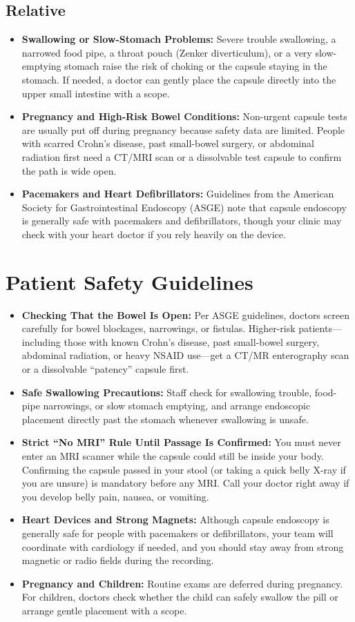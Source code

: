 \subsection{Relative}
\begin{itemize}
    \item \textbf{Swallowing or Slow-Stomach Problems:} Severe trouble swallowing, a narrowed food pipe, a throat pouch (Zenker diverticulum), or a very slow-emptying stomach raise the risk of choking or the capsule staying in the stomach. If needed, a doctor can gently place the capsule directly into the upper small intestine with a scope.
    \item \textbf{Pregnancy and High-Risk Bowel Conditions:} Non-urgent capsule tests are usually put off during pregnancy because safety data are limited. People with scarred Crohn's disease, past small-bowel surgery, or abdominal radiation first need a CT/MRI scan or a dissolvable test capsule to confirm the path is wide open.
    \item \textbf{Pacemakers and Heart Defibrillators:} Guidelines from the American Society for Gastrointestinal Endoscopy (ASGE) note that capsule endoscopy is generally safe with pacemakers and defibrillators, though your clinic may check with your heart doctor if you rely heavily on the device.
\end{itemize}

\section{Patient Safety Guidelines}
\begin{itemize}
    \item \textbf{Checking That the Bowel Is Open:} Per ASGE guidelines, doctors screen carefully for bowel blockages, narrowings, or fistulas. Higher-risk patients---including those with known Crohn's disease, past small-bowel surgery, abdominal radiation, or heavy NSAID use---get a CT/MR enterography scan or a dissolvable ``patency'' capsule first.
    \item \textbf{Safe Swallowing Precautions:} Staff check for swallowing trouble, food-pipe narrowings, or slow stomach emptying, and arrange endoscopic placement directly past the stomach whenever swallowing is unsafe.
    \item \textbf{Strict ``No MRI'' Rule Until Passage Is Confirmed:} You must never enter an MRI scanner while the capsule could still be inside your body. Confirming the capsule passed in your stool (or taking a quick belly X-ray if you are unsure) is mandatory before any MRI. Call your doctor right away if you develop belly pain, nausea, or vomiting.
    \item \textbf{Heart Devices and Strong Magnets:} Although capsule endoscopy is generally safe for people with pacemakers or defibrillators, your team will coordinate with cardiology if needed, and you should stay away from strong magnetic or radio fields during the recording.
    \item \textbf{Pregnancy and Children:} Routine exams are deferred during pregnancy. For children, doctors check whether the child can safely swallow the pill or arrange gentle placement with a scope.
\end{itemize}

